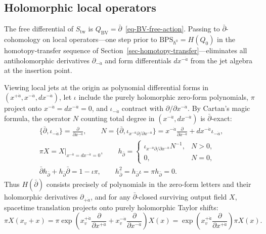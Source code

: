 \documentclass[11pt]{article}
\numberwithin{equation}{section}
\numberwithin{figure}{section}
\numberwithin{table}{section}
\begin{document}
\subsection{Holomorphic local operators}\label{dolbeault-contraction-and-wick-derivatives}

The free differential of $S_{\mathrm{tw}}$ is $Q_{\mathrm{BV}}=\bar\partial$~\eqref{eq-BV-free-action}. Passing to $\bar\partial$-cohomology on local operators---one step prior to $\mathrm{BPS}_{\hbar^0}=H(Q_0)$ in the homotopy-transfer sequence of Section~\ref{sec-homotopy-transfer}---eliminates all antiholomorphic derivatives $\partial_{-\dot a}$ and form differentials $dx^{-\dot a}$ from the jet algebra at the insertion point.

Viewing local jets at the origin as polynomial differential forms in $(x^{+\dot a},x^{-\dot a},dx^{-\dot a})$, let $\iota$ include the purely holomorphic zero-form polynomials, $\pi$ project onto $x^{-\dot a}=dx^{-\dot a}=0$, and $\iota_{-\dot a}$ contract with $\partial/\partial x^{-\dot a}$. By Cartan's magic formula, the operator $N$ counting total degree in $(x^{-\dot a},dx^{-\dot a})$ is $\bar\partial$-exact:
\begin{equation}\label{eq-B-20}
\begin{gathered}
\{\bar\partial,\iota_{-\dot a}\}=\frac{\partial}{\partial x^{-\dot a}},
\qquad
N=\{\bar\partial,\iota_{x^{-\dot a}\partial/\partial x^{-\dot a}}\}
=x^{-\dot a}\frac{\partial}{\partial x^{-\dot a}}
+dx^{-\dot a}\iota_{-\dot a},\\
\pi X=X\big|_{x^{-\dot a}=dx^{-\dot a}=0},
\qquad
h_{\bar\partial}=\begin{cases}
\iota_{x^{-\dot a}\partial/\partial x^{-\dot a}}N^{-1},&N>0,\\
0,&N=0,
\end{cases}\\
\bar\partial h_{\bar\partial}+h_{\bar\partial}\bar\partial=1-\iota\pi,
\qquad h_{\bar\partial}^2=h_{\bar\partial}\iota=\pi h_{\bar\partial}=0.
\end{gathered}
\end{equation}
Thus $H(\bar\partial)$ consists precisely of polynomials in the zero-form letters and their holomorphic derivatives $\partial_{+\dot a}$, and for any $\bar\partial$-closed surviving output field $X$, spacetime translation projects onto purely holomorphic Taylor shifts:
\begin{equation}\label{eq-B-21}
\pi X(x_v+x)
=\pi\exp\!\left(x_v^{+\dot a}\frac{\partial}{\partial x^{+\dot a}}
+x_v^{-\dot a}\frac{\partial}{\partial x^{-\dot a}}\right)X(x)
=\exp\!\left(x_v^{+\dot a}\frac{\partial}{\partial x^{+\dot a}}\right)\pi X(x).
\end{equation}
\end{document}
